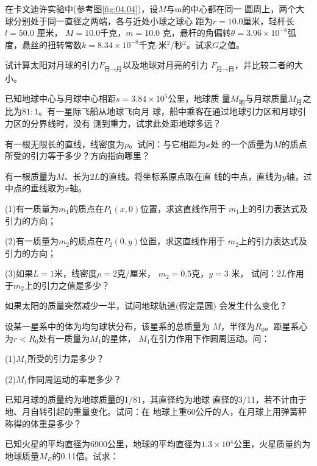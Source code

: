 \begin{exercises}

\exercise 在卡文迪许实验中(参考图\ref{fig:04.04})，设$ M $与$ $m的中心都在同一
圆周上，两个大球分别处于同一直径之两端，各与近处小球之球心
距为$ r = 1 0 . 0 $厘米，轻杆长$ l = 5 0 . 0 $ 厘米， $ M = 1 0 . 0 $千克，$ m = 1 0 . 0 $
克，悬杆的角偏转$ \theta = 3 . 9 6 \times 1 0 ^ { - 8 } $弧度，悬丝的扭转常数$ k = 8 . 3 4
  \times 1 0 ^ { - 8 } $千克$ \cdot $米$ ^2 $/秒$ ^2 $。试求$ G $之值。

\exercise 试计算太阳对月球的引力$ F _ {\text{日}\to\text{月}} $以及地球对月亮的引力
$ F _ {\text{月}\to\text{日}} $，并比较二者的大小。

\exercise 已知地球中心与月球中心相距$ s = 3 . 8 4 \times 1 0 ^ 5 $公里，地球质
量$ M _ {\text{地}} $与月球质量$ M _ {\text{月}}$之比为$ 81:1 $。有一星际飞船从地球飞向月
球，船中乘客在通过地球引力区和月球引力区的分界线时，没有
测到重力，试求此处距地球多远？

\exercise 有一根无限长的直线，线密度为$ \rho $。试问：与它相距为$ x $处
的一个质量为$ M $的质点所受的引力等于多少？方向指向哪里？

\clearpage
\exercise 有一根质量为$ M $、长为$ 2L $的直线。将坐标系原点取在直
线的中点，直线为$ y $轴，过中点的垂线取为$ x $轴。

(1)有一质量为$ m _ { 1 } $的质点在$ P _ { 1 } \left( x, 0 \right) $位置，求这直线作用于
$ m _ { 1 } $上的引力表达式及引力的方向；

(2)有一质量为$ m _ { 2 } $的质点在$ P _ { 2 } \left( 0, y \right) $位置，求这直线作用于
$ m _ { 2 } $上的引力表达式及引力的方向；

(3)如果$ L = 1 $米，线密度$ \rho = 2 $克/厘米， $ m _ { 2 } = 0 . 5 $克，$ y = 3 $ 米，
试问：$ 2L $作用于$ m _ { 2 } $上的引力之值是多少？

\exercise 如果太阳的质量突然减少一半，试问地球轨道(假定是圆)
会发生什么变化？

\exercise 设某一星系中的体为均匀球状分布，该星系的总质量为
$ M $，半径为$ R _ { 0 } $。距星系心为$ r < R _ { 0 } $处有一质量为$ M _ 1 $的星体，
$ M _ 1 $在引力作用下作圆周运动。问：

(1)$ M _ 1 $所受的引力是多少？

(2)$ M _ 1 $作同周运动的率是多少？

\exercise 已知月球的质量约为地球质量的$ 1/81 $，其直径约为地球
直径的3/11，若不计由于地、月自转引起的重量变化。试问：在
地球上重60公斤的人，在月球上用弹簧秤称得的体重是多少？

\exercise 已知火星的平均直径为6900公里，地球的平均直径为$ 1.3
  \times 1 0 ^ { 4 } $公里，火星质量约为地球质量$ M _ { E } $的0.11倍。试求：


\end{exercises}
